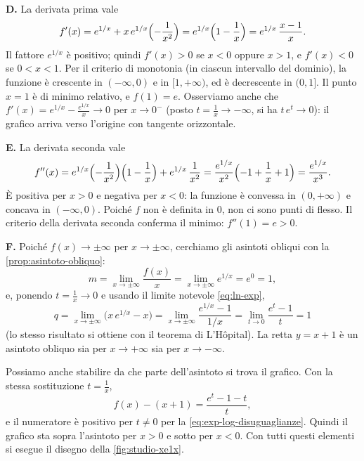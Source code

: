 \textbf{D.} La derivata prima vale
\begin{equation}\label{eq:studio-derivata-prima}
  f'(x)=e^{1/x}+x\,e^{1/x}\Bigl(-\frac1{x^{2}}\Bigr)=e^{1/x}\Bigl(1-\frac1x\Bigr)
  =e^{1/x}\,\frac{x-1}{x} .
\end{equation}
Il fattore $e^{1/x}$ è positivo; quindi $f'(x)>0$ se $x<0$ oppure $x>1$, e $f'(x)<0$ se
$0<x<1$. Per il criterio di monotonia (in ciascun intervallo del dominio), la funzione
è crescente in $(-\infty,0)$ e in $[1,+\infty)$, ed è decrescente in $(0,1]$. Il punto
$x=1$ è di minimo relativo, e $f(1)=e$. Osserviamo anche che
$f'(x)=e^{1/x}-\frac{e^{1/x}}{x}\to0$ per $x\to0^{-}$ (posto $t=\frac1x\to-\infty$, si ha
$t\,e^{t}\to0$): il grafico arriva verso l'origine con tangente orizzontale.

\textbf{E.} La derivata seconda vale
\begin{equation}\label{eq:studio-derivata-seconda}
  f''(x)=e^{1/x}\Bigl(-\frac1{x^{2}}\Bigr)\Bigl(1-\frac1x\Bigr)+e^{1/x}\,\frac1{x^{2}}
  =\frac{e^{1/x}}{x^{2}}\Bigl(-1+\frac1x+1\Bigr)=\frac{e^{1/x}}{x^{3}} .
\end{equation}
È positiva per $x>0$ e negativa per $x<0$: la funzione è convessa in $(0,+\infty)$ e
concava in $(-\infty,0)$. Poiché $f$ non è definita in $0$, non ci sono punti di
flesso. Il criterio della derivata seconda conferma il minimo: $f''(1)=e>0$.

\textbf{F.} Poiché $f(x)\to\pm\infty$ per $x\to\pm\infty$, cerchiamo gli asintoti
obliqui con la \cref{prop:asintoto-obliquo}:
\begin{equation}\label{eq:studio-m}
  m=\lim_{x\to\pm\infty}\frac{f(x)}{x}=\lim_{x\to\pm\infty}e^{1/x}=e^{0}=1 ,
\end{equation}
e, ponendo $t=\frac1x\to0$ e usando il limite notevole \eqref{eq:ln-exp},
\begin{equation}\label{eq:studio-q}
  q=\lim_{x\to\pm\infty}\bigl(x\,e^{1/x}-x\bigr)=\lim_{x\to\pm\infty}\frac{e^{1/x}-1}{1/x}
  =\lim_{t\to0}\frac{e^{t}-1}{t}=1
\end{equation}
(lo stesso risultato si ottiene con il teorema di L'Hôpital). La retta $y=x+1$ è un
asintoto obliquo sia per $x\to+\infty$ sia per $x\to-\infty$.

Possiamo anche stabilire da che parte dell'asintoto si trova il grafico. Con la stessa
sostituzione $t=\frac1x$,
\[
  f(x)-(x+1)=\frac{e^{t}-1-t}{t},
\]
e il numeratore è positivo per $t\neq0$ per la \eqref{eq:exp-log-disuguaglianze}.
Quindi il grafico sta sopra l'asintoto per $x>0$ e sotto per $x<0$. Con tutti questi
elementi si esegue il disegno della \cref{fig:studio-xe1x}.

